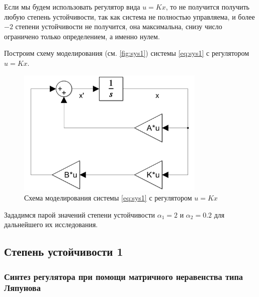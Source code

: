 Если мы будем использовать регулятор вида $u=Kx$, то не получится получить
любую степень устойчивости, так как система не полностью управляема, и
более $-2$ степени устойчивости не получится, она максимальна, снизу число ограничено 
только определением, а именно нулем.

Построим схему моделирования (см. \autoref{fig:sys1}) системы \eqref{eq:sys1} с регулятором $u=Kx$.
\begin{figure}[H]
    \centering
    \includegraphics[width=0.8\textwidth]{figs/task1_slx.png}
    \caption{Схема моделирования системы \eqref{eq:sys1} с регулятором $u=Kx$}
    \label{fig:sys1}
\end{figure}

Зададимся парой значений степени устойчивости $\alpha_1=2$ и $\alpha_2=0.2$
для дальнейшего их исследования.



\subsection{Степень устойчивости 1}

\subsubsection{Синтез регулятора при помощи матричного неравенства
типа Ляпунова} \label{sec:lyapexp}


